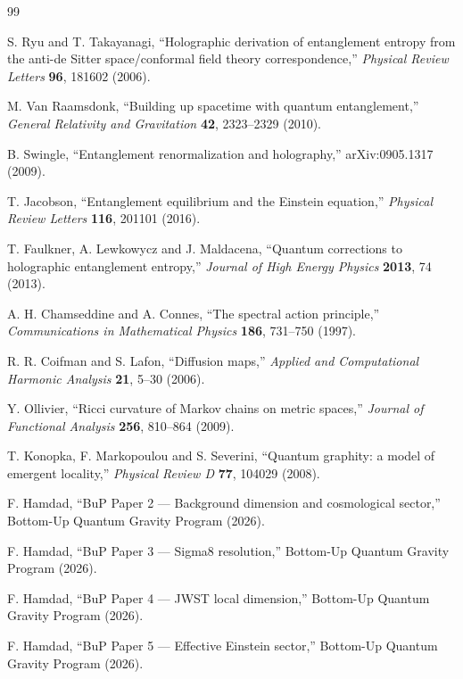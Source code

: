 \documentclass[11pt,a4paper]{article}
\begin{document}
\begin{thebibliography}{99}

S. Ryu and T. Takayanagi,
``Holographic derivation of entanglement entropy from the anti-de Sitter
space/conformal field theory correspondence,''
\emph{Physical Review Letters} \textbf{96}, 181602 (2006).

M. Van Raamsdonk,
``Building up spacetime with quantum entanglement,''
\emph{General Relativity and Gravitation} \textbf{42}, 2323--2329 (2010).

B. Swingle,
``Entanglement renormalization and holography,''
arXiv:0905.1317 (2009).

T. Jacobson,
``Entanglement equilibrium and the Einstein equation,''
\emph{Physical Review Letters} \textbf{116}, 201101 (2016).

T. Faulkner, A. Lewkowycz and J. Maldacena,
``Quantum corrections to holographic entanglement entropy,''
\emph{Journal of High Energy Physics} \textbf{2013}, 74 (2013).

A. H. Chamseddine and A. Connes,
``The spectral action principle,''
\emph{Communications in Mathematical Physics} \textbf{186}, 731--750 (1997).

R. R. Coifman and S. Lafon,
``Diffusion maps,''
\emph{Applied and Computational Harmonic Analysis} \textbf{21}, 5--30 (2006).

Y. Ollivier,
``Ricci curvature of Markov chains on metric spaces,''
\emph{Journal of Functional Analysis} \textbf{256}, 810--864 (2009).

T. Konopka, F. Markopoulou and S. Severini,
``Quantum graphity: a model of emergent locality,''
\emph{Physical Review D} \textbf{77}, 104029 (2008).

F. Hamdad,
``BuP Paper 2 --- Background dimension and cosmological sector,''
Bottom-Up Quantum Gravity Program (2026).

F. Hamdad,
``BuP Paper 3 --- Sigma8 resolution,''
Bottom-Up Quantum Gravity Program (2026).

F. Hamdad,
``BuP Paper 4 --- JWST local dimension,''
Bottom-Up Quantum Gravity Program (2026).

F. Hamdad,
``BuP Paper 5 --- Effective Einstein sector,''
Bottom-Up Quantum Gravity Program (2026).


\end{thebibliography}
\end{document}
